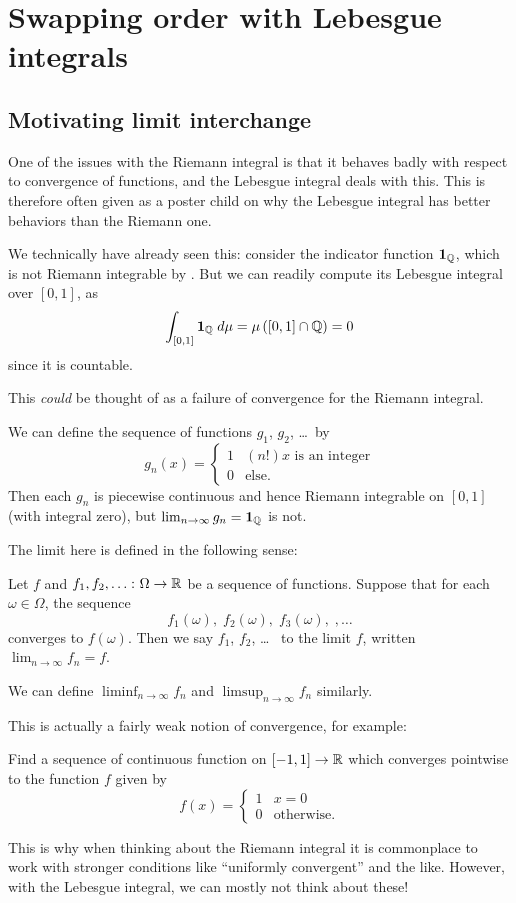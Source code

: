 \chapter{Swapping order with Lebesgue integrals}
\section{Motivating limit interchange}

One of the issues with the Riemann integral is
that it behaves badly with respect to convergence of functions,
and the Lebesgue integral deals with this.
This is therefore often given as a poster child
on why the Lebesgue integral has better behaviors than the Riemann one.

We technically have already seen this:
consider the indicator function $\mathbf{1}_\mathbb Q$,
which is not Riemann integrable by .
But we can readily compute its Lebesgue integral over $[0,1]$, as
\[ \int_{[0,1]} \mathbf{1}_\mathbb Q \; d\mu
	= \mu\left( [0,1] \cap \mathbb Q \right) = 0 \]
since it is countable.

This \emph{could} be thought of as a failure of convergence
for the Riemann integral.
\begin{example}
	\label{ex:1QQindicator}
	We can define the sequence of functions $g_1$, $g_2$, \dots\ by
	\[ g_n(x) = \begin{cases}
			1 & (n!)x \text{ is an integer} \\
			0 & \text{else}.
		\end{cases} \]
	Then each $g_n$ is piecewise continuous
	and hence Riemann integrable on $[0,1]$ (with integral zero),
	but $\lim_{n \to \infty} g_n = \mathbf{1}_\mathbb Q$ is not.
\end{example}

The limit here is defined in the following sense:
\begin{definition}
	Let $f$ and $f_1, f_2, \dots \colon \Omega \to \mathbb R$ be a sequence of functions.
	Suppose that for each $\omega \in \Omega$, the sequence
	\[ f_1(\omega), \; f_2(\omega), \; f_3(\omega), \;, \dots \]
	converges to $f(\omega)$.
	Then we say $f_1$, $f_2$, \dots\ 
	to the limit $f$, written $\lim_{n \to \infty} f_n = f$.

	We can define $\liminf_{n \to \infty} f_n$
	and $\limsup_{n \to \infty} f_n$ similarly.
\end{definition}
This is actually a fairly weak notion of convergence, for example:
\begin{exercise}
	Find a sequence of continuous function on $[-1,1] \to \mathbb R$
	which converges pointwise to the function $f$ given by
	\[ f(x) = \begin{cases}
			1 & x = 0 \\
			0 & \text{otherwise}.
		\end{cases} \]
\end{exercise}
This is why when thinking about the Riemann integral
it is commonplace to work with stronger conditions like
``uniformly convergent'' and the like.
However, with the Lebesgue integral, we can mostly not think about these!


